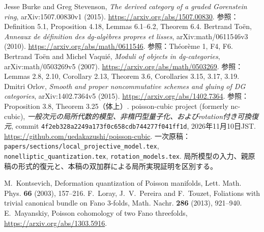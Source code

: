  Jesse Burke and Greg Stevenson,
\emph{The derived category of a graded Gorenstein ring},
arXiv:1507.00830v1 (2015).
\url{https://arxiv.org/abs/1507.00830}.
参照：Definition 5.1, Proposition 4.18, Lemmas 6.1--6.2, Theorem 6.4.
 Bertrand Toën,
\emph{Anneaux de définition des dg-algèbres propres et lisses},
arXiv:math/0611546v3 (2010).
\url{https://arxiv.org/abs/math/0611546}.
参照：Théorème 1, F4, F6.
 Bertrand Toën and Michel Vaquié,
\emph{Moduli of objects in dg-categories},
arXiv:math/0503269v5 (2007).
\url{https://arxiv.org/abs/math/0503269}.
参照：Lemmas 2.8, 2.10, Corollary 2.13, Theorem 3.6, Corollaries 3.15, 3.17, 3.19.
 Dmitri Orlov,
\emph{Smooth and proper noncommutative schemes and gluing of DG categories},
arXiv:1402.7364v5 (2015).
\url{https://arxiv.org/abs/1402.7364}.
参照：Proposition 3.8, Theorem 3.25（体上）.
 poisson-cubic project (formerly nc-cubic),
\emph{一般次元の局所代数的模型、非楕円型量子化、およびrotation付き可換復元},
commit \texttt{4f2eb328a2249a173f0c658cdb744277f041ff1d}, 2026年11月10日JST.
\url{https://github.com/uedakazushi/poisson-cubic}.
一次原稿：\texttt{papers/sections/local\_projective\_model.tex},
\texttt{nonelliptic\_quantization.tex}, \texttt{rotation\_models.tex}.
局所模型の入力、親原稿の形式的復元と、本稿の双加群による局所実現証明を区別する。



M.~Kontsevich,
Deformation quantization of Poisson manifolds,
Lett. Math. Phys. \textbf{66} (2003), 157--216.
F.~Loray, J.~V.~Pereira and F.~Touzet,
Foliations with trivial canonical bundle on Fano 3-folds,
Math. Nachr. \textbf{286} (2013), 921--940.
E.~Mayanskiy,
Poisson cohomology of two Fano threefolds,
\url{https://arxiv.org/abs/1303.5916}.
